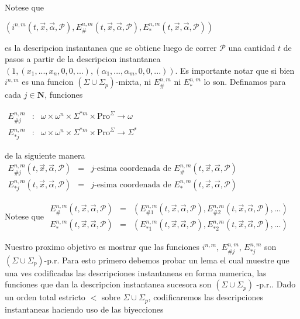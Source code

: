 Notese que

\(\displaystyle (i^{n,m}(t,\vec{x},\vec{\alpha},\mathcal{P}),E_{\#}^{n,m}(t,\vec{x},\vec{ \alpha},\mathcal{P}),E_{\ast }^{n,m}(t,\vec{x},\vec{\alpha},\mathcal{P})) \)

es la descripcion instantanea que se obtiene luego de correr \(\mathcal{P}\) una cantidad \(t\) de pasos a partir de la descripcion instantanea \( (1,(x_{1},...,x_{n},0,0,...),(\alpha _{1},...,\alpha _{m},0,0,...))\). Es importante notar que si bien \(i^{n,m}\) es una funcion \((\Sigma \cup \Sigma _{p})\)-mixta, ni \(E_{\#}^{n,m}\) ni \(E_{\ast }^{n,m}\) lo son.
Definamos para cada \(j\in \mathbf{N}\), funciones

\(\displaystyle \begin{array}{rcl} E_{\#j}^{n,m} & :& \omega \times \omega ^{n}\times \Sigma ^{\ast m}\times \mathrm{Pro}^{\Sigma }\rightarrow \omega \\ E_{\ast j}^{n,m} & :& \omega \times \omega ^{n}\times \Sigma ^{\ast m}\times \mathrm{Pro}^{\Sigma }\rightarrow \Sigma ^{\ast } \end{array} \)

de la siguiente manera
\(\displaystyle \begin{array}{rcl} E_{\#j}^{n,m}(t,\vec{x},\vec{\alpha},\mathcal{P}) & =& j\text{-esima coordenada de }E_{\#}^{n,m}(t,\vec{x},\vec{\alpha},\mathcal{P}) \\ E_{\ast j}^{n,m}(t,\vec{x},\vec{\alpha},\mathcal{P}) & =& j\text{-esima coordenada de }E_{\ast }^{n,m}(t,\vec{x},\vec{\alpha},\mathcal{P}) \end{array} \)

Notese que
\(\displaystyle \begin{array}{rcl} E_{\#}^{n,m}(t,\vec{x},\vec{\alpha},\mathcal{P}) & =& (E_{\#1}^{n,m}(t,\vec{x}, \vec{\alpha},\mathcal{P}),E_{\#2}^{n,m}(t,\vec{x},\vec{\alpha},\mathcal{P} ),...) \\ E_{\ast }^{n,m}(t,\vec{x},\vec{\alpha},\mathcal{P}) & =& (E_{\ast 1}^{n,m}(t, \vec{x},\vec{\alpha},\mathcal{P}),E_{\ast 2}^{n,m}(t,\vec{x},\vec{\alpha}, \mathcal{P}),...) \end{array} \)

Nuestro proximo objetivo es mostrar que las funciones \(i^{n,m}\), \( E_{\#j}^{n,m}\), \(E_{\ast j}^{n,m}\) son \((\Sigma \cup \Sigma _{p})\)-p.r.
Para esto primero debemos probar un lema el cual muestre que una ves codificadas las descripciones instantaneas en forma numerica, las funciones que dan la descripcion instantanea sucesora son \((\Sigma \cup \Sigma _{p})\) -p.r.. Dado un orden total estricto \(< \) sobre \(\Sigma \cup \Sigma _{p}\), codificaremos las descripciones instantaneas haciendo uso de las biyecciones

